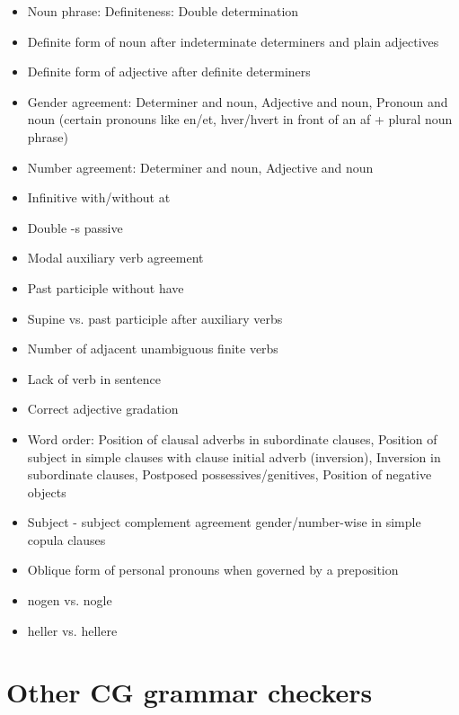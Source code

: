 \documentclass[a4paper,english,12pt]{article}
\begin{document}
\begin{spacing}{1.0}
\begin{itemize}
    \item Noun phrase: Definiteness: Double determination
    \item Definite form of noun after indeterminate determiners and plain adjectives
    \item Definite form of adjective after definite determiners
    \item Gender agreement: Determiner and noun, Adjective and noun, Pronoun and noun (certain pronouns like en/et, hver/hvert in front of an af + plural noun phrase)
    \item Number agreement: Determiner and noun, Adjective and noun
	\item    Infinitive with/without at
    \item Double -s passive
    \item Modal auxiliary verb agreement
    \item Past participle without have
    \item Supine vs. past participle after auxiliary verbs
    \item Number of adjacent unambiguous finite verbs
    \item Lack of verb in sentence
	\item Correct adjective gradation
	\item Word order: Position of clausal adverbs in subordinate clauses, Position of subject in simple clauses with clause initial adverb (inversion), Inversion in subordinate clauses, Postposed possessives/genitives, Position of negative objects
	\item Subject - subject complement agreement gender/number-wise in simple copula clauses
    \item Oblique form of personal pronouns when governed by a preposition
    \item nogen vs. nogle
    \item heller vs. hellere
\end{itemize}

\section{Other CG grammar checkers}


\end{spacing}
\end{document}
